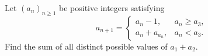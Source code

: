 Let $(a_n)_{n\ge1}$ be positive integers satisfying
\[
a_{n+1}=\begin{cases}a_n-1,&a_n\ge a_3,\\a_n+a_{a_n},&a_n<a_3.\end{cases}
\]
Find the sum of all distinct possible values of $a_1+a_2$.

